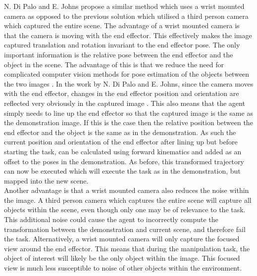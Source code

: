 N. Di Palo and E. Johns propose a similar method \cite{one-shot-imitation} which uses a wrist mounted camera as opposed to the previous solution which utilised a third person camera which captured the entire scene. The advantage of a wrist mounted camera is that the camera is moving with the end effector. This effectively makes the image captured translation and rotation invariant to the end effector pose. The only important information is the relative pose between the end effector and the object in the scene. The advantage of this is that we reduce the need for complicated computer vision methods for pose estimation of the objects between the two images \cite{one-shot-pose-estimate}. In the work by N. Di Palo and E. Johns, since the camera moves with the end effector, changes in the end effector position and orientation are reflected very obviously in the captured image \cite{one-shot-imitation}. This also means that the agent simply needs to line up the end effector so that the captured image is the same as the demonstration image. If this is the case then the relative position between the end effector and the object is the same as in the demonstration. As such the current position and orientation of the end effector after lining up but before starting the task, can be calculated using forward kinematics and added as an offset to the poses in the demonstration. As before, this transformed trajectory can now be executed which will execute the task as in the demonstration, but mapped into the new scene.\\

Another advantage is that a wrist mounted camera also reduces the noise within the image. A third person camera which captures the entire scene will capture all objects within the scene, even though only one may be of relevance to the task. This additional noise could cause the agent to incorrectly compute the transformation between the demonstration and current scene, and therefore fail the task. Alternatively, a wrist mounted camera will only capture the focused view around the end effector. This means that during the manipulation task, the object of interest will likely be the only object within the image. This focused view is much less susceptible to noise of other objects within the environment.\\

